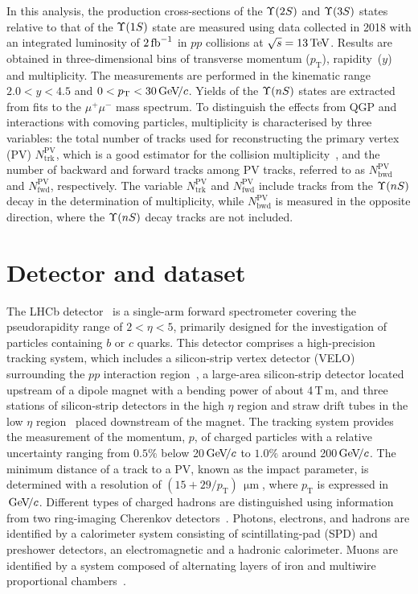 \documentclass[12pt,a4paper]{article}
\def\pvt{N_{\mathrm{trk}}^{\mathrm{PV}}}
\def\bkt{N_{\mathrm{bwd}}^{\mathrm{PV}}}
\def\fwt{N_{\mathrm{fwd}}^{\mathrm{PV}}}
\def\Pmu         {\ensuremath{\upmu}\xspace}
\def\Pmu         {\ensuremath{\mu}\xspace}
\def\mup        {{\ensuremath{\Pmu^+}}\xspace}
\def\mun        {{\ensuremath{\Pmu^-}}\xspace} \def\mupm       {{\ensuremath{\Pmu^\pm}}\xspace}
\newcommand{\nospaceunit}[1]{\ensuremath{\text{#1}}}
\newcommand{\aunit}[1]{\ensuremath{\text{\,#1}}}
\newcommand{\tev}{\aunit{Te\kern -0.1em V}\xspace}
\newcommand{\gevc}{\ensuremath{\aunit{Ge\kern -0.1em V\!/}c}\xspace}
\def\mum  {\ensuremath{\,\upmu\nospaceunit{m}}\xspace}
\def\fb   {\ensuremath{\aunit{fb}}\xspace}
\def\invfb   {\ensuremath{\fb^{-1}}\xspace}
\def\pt         {\ensuremath{p_{\mathrm{T}}}\xspace}
\begin{document}
In this analysis, the production cross-sections of the $\Upsilon{(2S)}$ and $\Upsilon{(3S)}$ states relative to that of the $\Upsilon{(1S)}$ state are measured using data collected in 2018 with an integrated luminosity of $2\invfb$ in $pp$ collisions at $\sqrt{s}=13\tev$. Results are obtained in three-dimensional bins of transverse momentum (\pt), \mbox{rapidity ($y$)} and multiplicity. The measurements are performed in the kinematic range $2.0 <y<4.5$ and \mbox{$0 <\pt <30 \gevc$}.
Yields of the $\Upsilon{(nS)}$ states are extracted from fits to the $\mup\mun$ mass spectrum. 
To distinguish the effects from QGP and interactions with comoving particles, multiplicity is characterised by three variables: 
the total number of tracks used for reconstructing the primary vertex (PV) $\pvt$, which is a good estimator for the collision multiplicity~\cite{LHCb-DP-2014-001, Kucharczyk:1756296}, and the number of backward and forward tracks among PV tracks, referred to as $\bkt$ and $\fwt$, respectively. 
The variable $\pvt$ and $\fwt$ include tracks from the $\Upsilon{(nS)}$  decay in the determination of multiplicity, while $\bkt$ is measured in the opposite direction, where the $\Upsilon{(nS)}$ decay tracks are not included.



\section{Detector and dataset}
The LHCb detector~\cite{LHCb-DP-2008-001,LHCb-DP-2014-002} is a single-arm forward spectrometer covering the pseudorapidity range of $2 < \eta <5$, primarily designed for the investigation of particles containing $b$ or $c$ quarks. This detector comprises a high-precision tracking system, which includes a silicon-strip vertex detector (VELO) surrounding the $pp$ interaction region~\cite{LHCb-DP-2014-001}, a large-area silicon-strip detector located upstream of a dipole magnet with a bending power of about 4\,T\,m, and three stations of silicon-strip detectors in the high $\eta$ region and straw drift tubes in the low $\eta$ region~\cite{LHCb-DP-2013-003} placed downstream of the magnet. 
The tracking system provides the measurement of the momentum, $p$, of charged particles with a relative uncertainty ranging from $0.5\%$ below 20\gevc to $1.0\%$ around 200\gevc. The minimum distance of a track to a PV, known as the impact parameter, is determined with a resolution of $(15 + 29/\pt)\mum$, where \pt is expressed in \gevc.
Different types of charged hadrons are distinguished using information from two ring-imaging Cherenkov detectors~\cite{LHCb-DP-2012-003}. 
Photons, electrons, and hadrons are identified by a calorimeter system consisting of scintillating-pad (SPD) and preshower detectors, an electromagnetic and a hadronic calorimeter. 
Muons are identified by a system composed of alternating layers of iron and multiwire proportional chambers~\cite{LHCb-DP-2012-002}.
\end{document}
